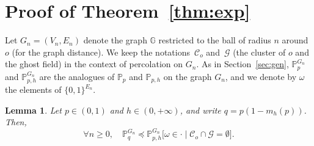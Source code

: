 \documentclass[10pt]{amsart}
\newtheorem{lemm}[theo]{Lemma}\newtheorem{prop}[theo]{Proposition}\newtheorem{coro}[theo]{Corollary}\newtheorem{conj}[theo]{Conjecture}
\theoremstyle{definition}\newtheorem{defi}[theo]{Definition}\newtheorem{rema}[theo]{Remark}\newtheorem{exam}[theo]{Example}\newtheorem{exem}[theo]{Example}\newtheorem{nota}[theo]{Notation}
\newcommand{\G}{\mathbb{G}}
\newcommand{\Pro}{\mathbb{P}}
\newcommand{\calC}{\mathcal{C}}
\newcommand{\calG}{\mathcal{G}}
\let\oldforall\forall
\renewcommand*{\forall}{\mathrel{\oldforall}}
\begin{document}
\section{Proof of Theorem~\ref{thm:exp}}\label{sec:proof}

Let $G_n=(V_n,E_n)$ denote the graph $\G$ restricted to the ball of radius $n$ around~$o$ (for the graph distance). We keep the notations~$\calC_o$ and~$\calG$ (the cluster of $o$ and the ghost field) in the context of percolation on $G_n$. As in Section~\ref{sec:gen}, $\Pro_{p}^{G_n}$ and $\Pro_{p,h}^{G_n}$ are the analogues of $\Pro_p$ and $\Pro_{p,h}$ on the graph $G_n$, and we denote by $\omega$ the elements of $\{0,1\}^{E_n}$.

\begin{lemm}\label{lem:coupl_perco}
Let $p \in (0,1)$ and $h \in (0,+\infty)$, and write $q=p(1-m_h(p))$. Then,
\[
\forall n \ge 0, \quad \Pro_{q}^{G_n} \preceq \Pro_{p,h}^{G_n} \big[\omega \in \cdot \; \big| \; \calC_o \cap \calG = \emptyset \big].
\]
\end{lemm}
\end{document}
